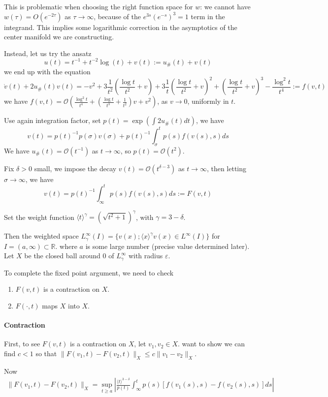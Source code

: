\documentclass[letterpaper,11pt]{article}
\newcommand{\R}{\mathbb{R}}
\newcommand{\rmO}{\mathcal{O}}
\newcommand{\eps}{\varepsilon}
\numberwithin{equation}{section}
\theoremstyle{plain}
\begin{document}
This is problematic when choosing the right function space for $w$: we cannot have $w(\tau) = O(e^{-2\tau})$ as $\tau \to \infty$, because of the $e^{3s}(e^{-s})^3 = 1$ term in the integrand. This implies some logarithmic correction in the asymptotics of the center manifold we are constructing.


Instead, let us try the ansatz
\[
u(t)=t^{-1}+t^{-2}\log(t) +v(t) := u_\#(t)+v(t)
\]
we end up with the equation 
\[
\dot{v}(t)+2u_\#(t)v(t) = -v^2+3\frac{1}{t^2}(\frac{\log t}{t^2}+v)+3\frac{1}{t}(\frac{\log t}{t^2}+v)^2+(\frac{\log t}{t^2}+v)^3 -\frac{\log^2 t}{t^4} := f(v,t)
\]
 we have $f(v,t) = \rmO(\frac{\log^2 t}{t^4}+(\frac{\log t}{t^3}+\frac{1}{t^2}) v+v^2)$, as $v\to 0$, uniformly in $t$.

Use again integration factor, set $p(t) = \exp(\int 2u_\#(t)dt)$, we have
\[
v(t)=p(t)^{-1}p(\sigma) v(\sigma)+p(t)^{-1}\int_\sigma^t p(s)f(v(s),s)ds
\]
We have $u_\#(t) = \rmO(t^{-1})$ as $t \to \infty$, so $p(t) = \rmO(t^2)$.

Fix $\delta>0$ small, we impose the decay $v(t) = \rmO(t^{\delta-3})$ as $t \to \infty$, then letting $\sigma \to \infty$, we have
\[
v(t) = p(t)^{-1}\int_\infty^t p(s)f(v(s),s)ds := F(v,t)
\]


Set the weight function $\langle t \rangle^{\gamma} = (\sqrt{t^2+1})^{\gamma}$, with $\gamma= 3-\delta$.

Then the weighted space $L_\gamma^\infty (I) = \{ v(x);  \langle x\rangle^{\gamma} v(x) \in L^\infty(I) \}$ for $I = (a,\infty)\subset \R$. where $a$ is some large number (precise value determined later). Let $X$ be the closed ball around $0$ of $L_\gamma^\infty$ with radius $\eps$.


To complete the fixed point argument, we need to check
\begin{enumerate}

\item $F(v,t)$ is a contraction on $X$.
\item $F(\cdot,t)$ maps $X$ into $X$.

\end{enumerate}
\paragraph{Contraction}
First, to see $F(v,t)$ is a contraction on $X$, let $v_1,v_2 \in X$. want to show we can find $c<1$ so that $\| F(v_1,t) - F(v_2,t)\|_X \le c\|v_1-v_2\|_X$.

Now
\begin{align*}
\|F(v_1,t)-F(v_2,t)\|_X =\sup_{t\ge a} \left| \frac{\langle t\rangle^{3-\delta}}{p(t)} \int_\infty^t p(s)[f(v_1(s),s)-f(v_2(s),s)]ds \right|
\end{align*}
\end{document}
